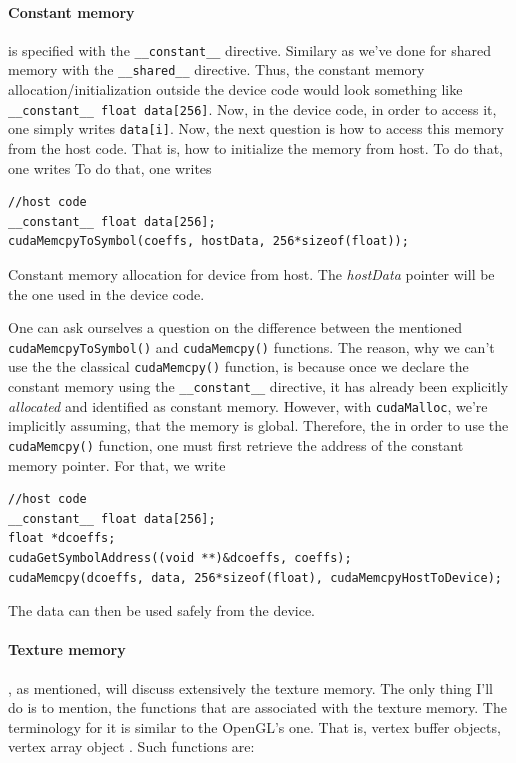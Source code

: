 \paragraph{Constant memory } is specified with the \verb|__constant__| directive.
Similary as we've done for shared memory with the \verb|__shared__| directive. 
Thus, the constant memory allocation/initialization outside the device code would look something like 
\verb|__constant__ float data[256]|. Now, in the device code, in order to access it, one simply writes \verb|data[i]|.
Now, the next question is how to access this memory from the host code. That is, how to initialize the 
memory from host. To do that, one writes 
 To do that, one writes 
\begin{listing}
\begin{verbatim}
//host code
__constant__ float data[256];
cudaMemcpyToSymbol(coeffs, hostData, 256*sizeof(float));
\end{verbatim}
\caption{Constant memory allocation for device from host. The \textsl{hostData} pointer will be 
the one used in the device code. \cite{talonmies_cudamemcpytosymbol_2013}}
\end{listing}

One can ask ourselves a question on the difference between the mentioned \verb|cudaMemcpyToSymbol()| and \verb|cudaMemcpy()|
functions. The reason, why we can't use the the classical \verb|cudaMemcpy()| function, is because once we declare 
the constant memory using the \verb|__constant__| directive, it has already been explicitly \textit{allocated} and identified as 
constant memory. However, with \verb|cudaMalloc|, we're implicitly assuming, that the memory is global. Therefore, the in order to use 
the \verb|cudaMemcpy()| function, one must first retrieve the address of the constant memory pointer.
For that, we write
\begin{verbatim}
//host code
__constant__ float data[256];
float *dcoeffs;
cudaGetSymbolAddress((void **)&dcoeffs, coeffs);
cudaMemcpy(dcoeffs, data, 256*sizeof(float), cudaMemcpyHostToDevice);
\end{verbatim}
The data can then be used safely from the device.

\vspace{-15}
\paragraph{Texture memory}, as mentioned, will discuss extensively the texture memory. The only 
thing I'll do is to mention, the functions that are associated with the texture memory. The terminology 
for it is similar to the OpenGL's one. That is, vertex buffer objects, vertex array object \cite{noauthor_docsgl_nodate}. Such functions are:

